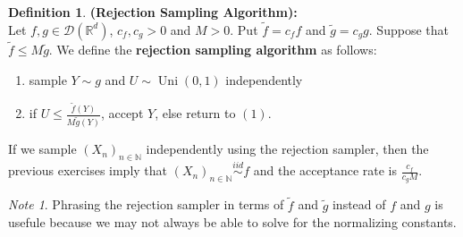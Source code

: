 \documentclass[12pt]{amsart}
\theoremstyle{definition}
\newtheorem{defn}[definition]{Definition}
\theoremstyle{remark}
\newtheorem{note}[remark]{Note}
\theoremstyle{definition}
\newcommand{\N}{\mathbb{N}}
\newcommand{\R}{\mathbb{R}}
\newcommand{\MD}{\mathcal{D}}
\newcommand{\iid}{\stackrel{iid}{\sim}}
\DeclareMathOperator{\uni}{Uni}
\begin{document}
	\begin{defn}\textbf{(Rejection Sampling Algorithm):} \\
		Let $f, g \in \MD(\R^d)$, $c_f,c_g>0$ and $M > 0$. Put $\tilde{f} = c_f f$ and $\tilde{g} = c_g g$. Suppose that $\tilde{f} \leq M \tilde{g}$. We define the \textbf{rejection sampling algorithm} as follows:
		\begin{enumerate}
			\item sample $Y \sim g$ and $U \sim \uni(0,1)$ independently
			\item if $U \leq \frac{\tilde{f}(Y)}{M\tilde{g}(Y)} $, accept $Y$, else return to $(1)$.
		\end{enumerate}
		If we sample $(X_n)_{n \in \N}$ independently using the rejection sampler, then the previous exercises imply that $(X_n)_{n \in \N} \iid f$ and the acceptance rate is $\frac{c_f}{c_gM}$.
	\end{defn}

	\begin{note}
		Phrasing the rejection sampler in terms of $\tilde{f}$ and $\tilde{g}$ instead of $f$ and $g$ is usefule because we may not always be able to solve for the normalizing constants.
	\end{note}

	
\end{document}
